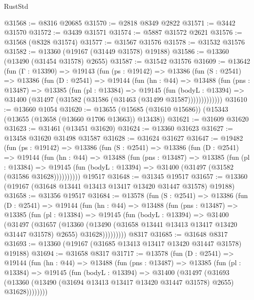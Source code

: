 \begin{lexlean}{RustStd}
\begin{coremodule}
@31568 := @8316 @20685
@31570 := @2818 @8349 @2822
@31571 := @3442 @31570
@31572 := @3439 @31571
@31574 := @5887 @31572 @2621
@31576 := @31568 (@8328 @31574)
@31577 := @31567 @31576
@31578 := @31532 @31576
@31582 := @13360 (@19167 (@31449 @31578) @19188)
@31586 := @13360 (@13490 (@31454 @31578) @2655)
@31587 := @31542 @31576
@31609 := @13642
    (fun (Γ : @13390) =>
    @19143
      (fun (ps : @19142) =>
      @13386
        (fun (S : @2541) =>
        @13386
          (fun (D : @2541) =>
          @19144
            (fun (hn : @44) =>
            @13488
              (fun (pns : @13487) =>
              @13385
                (fun (pl : @13384) =>
                @19145
                  (fun (bodyL : @13394) =>
                  @31400 (@31497 (@31582 (@31586 (@31463 (@31499 @31587)))))))))))))
@31610 := @13660 @1054
@31620 := @13655 (@15685 (@31610 @15686)) (@15343 (@13655 (@13658 (@13660 @1706 @13663)) @13438))
@31621 := @31609 @31620
@31623 := @31461 (@13451 @31620)
@31624 := @13360 @31623
@31627 := @13458 @31620 @31498 @31587
@31628 := @31624 @31627
@31647 := @19482
    (fun (ps : @19142) =>
    @13386
      (fun (S : @2541) =>
      @13386
        (fun (D : @2541) =>
        @19144
          (fun (hn : @44) =>
          @13488
            (fun (pns : @13487) =>
            @13385
              (fun (pl : @13384) =>
              @19145 (fun (bodyL : @13394) => @31400 (@31497 (@31582 (@31586 @31628))))))))))
    @19517
@31648 := @31345 @19517
@31657 := @13360 (@19167 (@31648 @13441 @13413 @13417 @13420 @31447 @31578) @19188)
@31658 := @31356 @19517
@31684 := @13578
    (fun (S : @2541) =>
    @13386
      (fun (D : @2541) =>
      @19144
        (fun (hn : @44) =>
        @13488
          (fun (pns : @13487) =>
          @13385
            (fun (pl : @13384) =>
            @19145
              (fun (bodyL : @13394) =>
              @31400
                (@31497
                  (@31657
                    (@13360
                      (@13490 (@31658 @13441 @13413 @13417 @13420 @31447 @31578) @2655)
                      @31628)))))))))
    @8317
@31685 := @31648 @8317
@31693 := @13360 (@19167 (@31685 @13413 @13417 @13420 @31447 @31578) @19188)
@31694 := @31658 @8317
@31717 := @13578
    (fun (D : @2541) =>
    @19144
      (fun (hn : @44) =>
      @13488
        (fun (pns : @13487) =>
        @13385
          (fun (pl : @13384) =>
          @19145
            (fun (bodyL : @13394) =>
            @31400
              (@31497
                (@31693
                  (@13360 (@13490 (@31694 @13413 @13417 @13420 @31447 @31578) @2655) @31628))))))))

\end{coremodule}
\end{lexlean}

